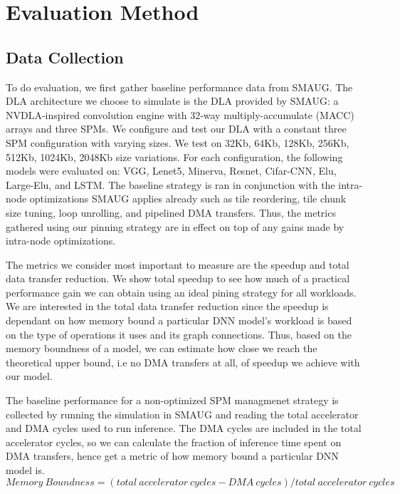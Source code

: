 \chapter{Evaluation Method} %

\label{Chapter6} %

\section{Data Collection}
To do evaluation, we first gather baseline performance data from SMAUG. The DLA architecture we
choose to simulate is the DLA provided by SMAUG: a NVDLA-inspired convolution engine with
32-way multiply-accumulate (MACC) arrays and three SPMs. We configure and test our DLA with
a constant three SPM configuration with varying sizes. We test on 32Kb, 64Kb, 128Kb, 256Kb,
512Kb, 1024Kb, 2048Kb size variations. For each configuration, the following models were
evaluated on: VGG, Lenet5, Minerva, Resnet, Cifar-CNN, Elu, Large-Elu, and LSTM. The baseline
strategy is ran in conjunction with the intra-node optimizations SMAUG applies already such
as tile reordering, tile chunk size tuning, loop unrolling, and pipelined DMA transfers. Thus,
the metrics gathered using our pinning strategy are in effect on top of any gains made by
intra-node optimizations.

The metrics we consider most important to measure are the speedup and total
data transfer reduction. We show total speedup to see how much of a practical
performance gain we can obtain using an ideal pining strategy for all workloads.
We are interested in the total data transfer reduction since the speedup is 
dependant on how memory bound a particular DNN model's workload is based on the type
of operations it uses and its graph connections. Thus, based on the memory boundness
of a model, we can estimate how close we reach the theoretical upper bound, i.e
no DMA transfers at all, of speedup we achieve with our model.

The baseline performance for a non-optimized SPM managmenet strategy is
collected by running the simulation in SMAUG and reading the total accelerator
and DMA cycles used to run inference. The DMA cycles are included in the total
accelerator cycles, so we can calculate the fraction of inference time spent on
DMA transfers, hence get a metric of how memory bound a particular DNN model
is.
\[
    Memory\ Boundness = (total\ accelerator\ cycles - DMA\ cycles) / total\ accelerator\ cycles
\]


